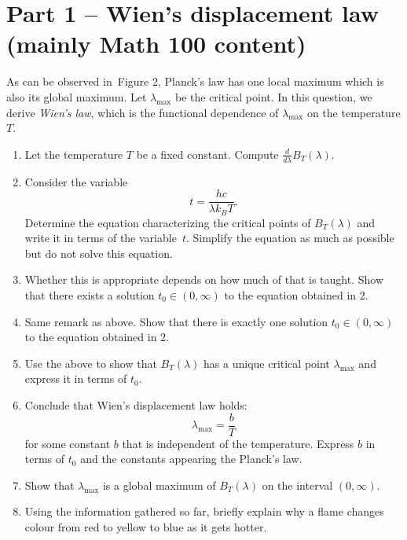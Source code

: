 \documentclass{exam}
\begin{document}
\newpage 

\section*{Part 1 -- Wien's displacement law (mainly Math 100 content)}
As can be observed in~Figure 2, Planck's law has one local maximum which is also its global maximum. Let $\lambda_{\mathrm{max}}$ be the critical point. In this question, we derive \emph{Wien's law}, which is the functional dependence of $\lambda_{\mathrm{max}}$ on the temperature $T$.

\begin{enumerate}
            \item Let the temperature $T$ be a fixed constant. Compute $\frac{d}{d\lambda}B_T(\lambda)$. 

     
            
            \item Consider the variable $$t=\frac{hc}{\lambda k_B T}.$$ Determine the equation characterizing the critical points of $B_T(\lambda)$ and write it in terms of the variable~$t$. Simplify the equation as much as possible but do not solve this equation.
  
            
            \item {\color{blue}Whether this is appropriate depends on how much of that is taught.} Show that there exists a solution $t_0\in(0,\infty)$ to the equation obtained in 2.

 

            \item {\color{blue}Same remark as above.} Show that there is exactly one solution $t_0\in(0,\infty)$ to the equation obtained in 2.

  
            
            \item Use the above to show that $B_T(\lambda)$ has a unique critical point $\lambda_{\mathrm{max}}$ and express it in terms of $t_0$.

   
            
            \item Conclude that Wien's displacement law holds: $$\lambda_{\mathrm{max}}=\frac{b}{T}$$ for some constant $b$ that is independent of the temperature. Express $b$ in terms of $t_0$ and the constants appearing the Planck's law.
  
            
            \item Show that $\lambda_{\mathrm{max}}$ is a global maximum of $B_T(\lambda)$ on the interval $(0, \infty)$.

          
            
            \item Using the information gathered so far, briefly explain why a flame changes colour from red to yellow to blue as it gets hotter.


\end{enumerate}
\end{document}

